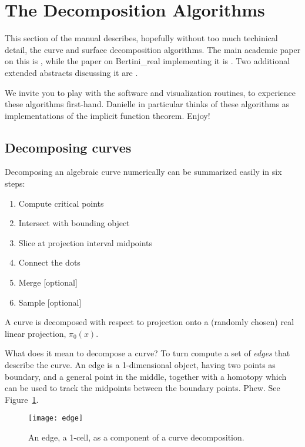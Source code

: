 \section{The Decomposition Algorithms}
\label{sec:algo}

This section of the manual describes, hopefully without too much techinical detail, the curve and surface decomposition algorithms.  The main academic paper on this is \cite{besana2013cell}, while the paper on Bertini\_real implementing it is \cite{BrN15}.  Two additional extended abstracts discussing it are \cite{Brake2014, On14}.

We invite you to play with the software and visualization routines, to experience these algorithms first-hand.  Danielle in particular thinks of these algorithms as implementations of the implicit function theorem.  Enjoy!


\subsection{Decomposing curves}
\label{sec:algo_curve}



Decomposing an algebraic curve numerically can be summarized easily in six steps:
%
\begin{enumerate}[noitemsep]
\item Compute critical points
\item Intersect with bounding object
\item Slice at projection interval midpoints
\item Connect the dots
\item Merge [optional]
\item Sample [optional]
\end{enumerate}

A curve is decomposed with respect to projection onto a (randomly chosen) real linear projection, $\pi_0(x)$.


What does it mean to decompose a curve?  To turn compute a set of {\em edges} that describe the curve.  An edge is a 1-dimensional object, having two points as boundary, and a general point in the middle, together with a homotopy which can be used to track the midpoints between the boundary points.  Phew.  See Figure~\ref{fig:edge}.




\begin{figure}[H]
\begin{center}
\texttt{[image: edge]}
\caption{An edge, a 1-cell, as a component of a curve decomposition.}
\label{fig:edge}
\end{center}
\end{figure}


